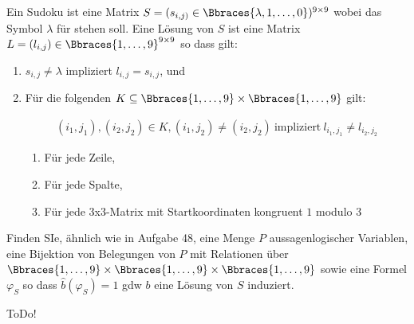 
\begin{exercise}[49]

Ein Sudoku ist eine Matrix $S = (s_{i, j)} \in \Bbraces{\lambda, 1, \dots, 0})^{9 \times 9}$ wobei das Symbol $\lambda$ für  stehen soll.
Eine Lösung von $S$ ist eine Matrix $L = (l_{i, j}) \in \Bbraces{1, \dots, 9}^{9 \times 9}$ so dass gilt:

\begin{enumerate}[label = \arabic*.]

    \item $s_{i, j} \neq \lambda$ impliziert $l_{i, j} = s_{i, j}$, und
    
    \item Für die folgenden $K \subseteq \Bbraces{1, \dots, 9} \times \Bbraces{1, \dots, 9}$ gilt:
    
    \begin{align*}
        (i_1, j_1), (i_2, j_2) \in K,
        (i_1, j_2) \neq (i_2, j_2)
        ~\text{impliziert}~
        l_{i_1, j_1} \neq l_{i_2, j_2}
    \end{align*}

    \begin{enumerate}
        \item Für jede Zeile,
        \item Für jede Spalte,
        \item Für jede 3x3-Matrix mit Startkoordinaten kongruent $1$ modulo $3$
    \end{enumerate}

\end{enumerate}

Finden SIe, ähnlich wie in Aufgabe 48, eine Menge $P$ aussagenlogischer Variablen, eine Bijektion von Belegungen von $P$ mit Relationen über $\Bbraces{1, \dots, 9} \times \Bbraces{1, \dots, 9} \times \Bbraces{1, \dots, 9}$ sowie eine Formel $\varphi_S$ so dass $\hat{b}(\varphi_S) = 1$ gdw $b$ eine Lösung von $S$ induziert.

\end{exercise}


\begin{solution}

ToDo!

\end{solution}

